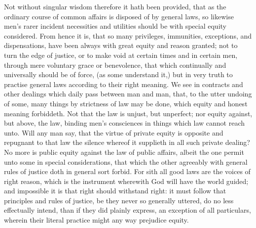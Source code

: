 Not without singular wisdom therefore it hath been provided, that as the ordinary course of common affairs is disposed of by general laws, so likewise men’s rarer incident necessities and utilities should be with special equity considered. From hence it is, that so many privileges, immunities, exceptions, and dispensations, have been always with great equity and reason granted; not to turn the edge of justice, or to make void at certain times and in certain men, through mere voluntary grace or benevolence, that which continually and universally should be of force, (as some understand it,) but in very truth to practise general laws according to their right meaning.
We see in contracts and other dealings which daily pass between man and man, that, to the utter undoing of some, many things by strictness of law may be done, which equity and honest meaning forbiddeth. Not that the law is unjust, but unperfect; nor equity against, but above, the law, binding men’s consciences in things which law cannot reach unto. Will any man say, that the virtue of private equity is opposite and repugnant to that law the silence whereof it supplieth in all such private dealing? No more is public equity against the law of public affairs, albeit the one permit unto some in special considerations, that which the other  agreeably with general rules of justice doth in general sort forbid. For sith all good laws are the voices of right reason, which is the instrument wherewith God will have the world guided; and impossible it is that right should withstand right: it must follow that principles and rules of justice, be they never so generally uttered, do no less effectually intend, than if they did plainly express, an exception of all particulars, wherein their literal practice might any way prejudice equity.
